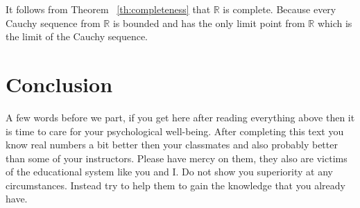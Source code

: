 \documentclass[color=black,11pt]{elegantpaper}
\begin{document}
It follows from Theorem ~\ref{th:completeness} that $\mathbb{R}$ is complete. Because  every Cauchy sequence from $\mathbb{R}$ is bounded and has the only limit point from $\mathbb{R}$ which is the limit of the Cauchy sequence. 






\section*{Conclusion}
A few words before we part, if you get here after reading everything above then it is time to care for your psychological well-being. After completing this text you know real numbers a bit better then your classmates and also probably better than some of your instructors. Please have mercy on them, they also are victims of the educational system like you and I. Do not show you superiority at any circumstances. Instead try to help them to gain the knowledge that you already have.

\end{document}
